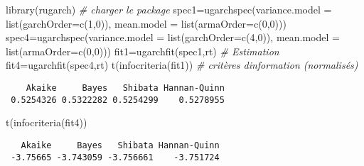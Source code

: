 \documentclass[
  ignorenonframetext,
]{beamer}
\newenvironment{Shaded}{\begin{snugshade}}{\end{snugshade}}
\newcommand{\AttributeTok}[1]{\textcolor[rgb]{0.77,0.63,0.00}{#1}}
\newcommand{\CommentTok}[1]{\textcolor[rgb]{0.56,0.35,0.01}{\textit{#1}}}
\newcommand{\DecValTok}[1]{\textcolor[rgb]{0.00,0.00,0.81}{#1}}
\newcommand{\FunctionTok}[1]{\textcolor[rgb]{0.00,0.00,0.00}{#1}}
\newcommand{\NormalTok}[1]{#1}
\newcommand{\OtherTok}[1]{\textcolor[rgb]{0.56,0.35,0.01}{#1}}
\begin{document}
\begin{frame}[fragile]
\begin{Shaded}
\begin{Highlighting}[]
\FunctionTok{library}\NormalTok{(rugarch)   }\CommentTok{\# charger le package}
\NormalTok{spec1}\OtherTok{=}\FunctionTok{ugarchspec}\NormalTok{(}\AttributeTok{variance.model =} \FunctionTok{list}\NormalTok{(}\AttributeTok{garchOrder=}\FunctionTok{c}\NormalTok{(}\DecValTok{1}\NormalTok{,}\DecValTok{0}\NormalTok{)),}
                \AttributeTok{mean.model =} \FunctionTok{list}\NormalTok{(}\AttributeTok{armaOrder=}\FunctionTok{c}\NormalTok{(}\DecValTok{0}\NormalTok{,}\DecValTok{0}\NormalTok{)))}
\NormalTok{spec4}\OtherTok{=}\FunctionTok{ugarchspec}\NormalTok{(}\AttributeTok{variance.model =} \FunctionTok{list}\NormalTok{(}\AttributeTok{garchOrder=}\FunctionTok{c}\NormalTok{(}\DecValTok{4}\NormalTok{,}\DecValTok{0}\NormalTok{)),}
                \AttributeTok{mean.model =} \FunctionTok{list}\NormalTok{(}\AttributeTok{armaOrder=}\FunctionTok{c}\NormalTok{(}\DecValTok{0}\NormalTok{,}\DecValTok{0}\NormalTok{)))}
\NormalTok{fit1}\OtherTok{=}\FunctionTok{ugarchfit}\NormalTok{(spec1,rt)  }\CommentTok{\# Estimation}
\NormalTok{fit4}\OtherTok{=}\FunctionTok{ugarchfit}\NormalTok{(spec4,rt)}
\FunctionTok{t}\NormalTok{(}\FunctionTok{infocriteria}\NormalTok{(fit1))  }\CommentTok{\# critères d\textquotesingle{}information (normalisés)}
\end{Highlighting}
\end{Shaded}

\begin{verbatim}
    Akaike     Bayes   Shibata Hannan-Quinn
 0.5254326 0.5322282 0.5254299    0.5278955
\end{verbatim}

\begin{Shaded}
\begin{Highlighting}[]
\FunctionTok{t}\NormalTok{(}\FunctionTok{infocriteria}\NormalTok{(fit4))}
\end{Highlighting}
\end{Shaded}

\begin{verbatim}
   Akaike     Bayes   Shibata Hannan-Quinn
 -3.75665 -3.743059 -3.756661    -3.751724
\end{verbatim}
\end{frame}
\end{document}

